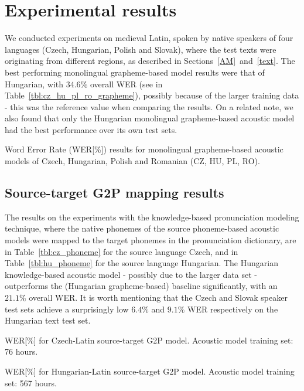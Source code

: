 \documentclass[runningheads,a4paper]{llncs}
\begin{document}
\section{Experimental results}\label{results}
We conducted experiments on medieval Latin, spoken by native speakers of four languages (Czech, Hungarian, Polish and Slovak), where the test texts were originating from different regions, as described in Sections~\ref{AM}~and~\ref{text}.
The best performing monolingual grapheme-based model results were that of Hungarian, with $34.6\%$ overall WER (see in Table~\ref{tbl:cz_hu_pl_ro_grapheme}), possibly because of the larger training data - this was the reference value when comparing the results.
On a related note, we also found that only the Hungarian monolingual grapheme-based acoustic model had the best performance over its own test sets.

\begin{table}
\centering
\caption{Word Error Rate (WER[\%]) results for monolingual grapheme-based acoustic models of Czech, Hungarian, Polish and Romanian (CZ, HU, PL, RO).}
\label{tbl:cz_hu_pl_ro_grapheme}
\end{table}

\subsection{Source-target G2P mapping results}
The results on the experiments with the knowledge-based pronunciation modeling technique, where the native phonemes of the source phoneme-based acoustic models were mapped to the target phonemes in the pronunciation dictionary, are in Table~\ref{tbl:cz_phoneme} for the source language Czech, and in Table~\ref{tbl:hu_phoneme} for the source language Hungarian.
The Hungarian knowledge-based acoustic model - possibly due to the larger data set - outperforms the (Hungarian grapheme-based) baseline significantly, with an $21.1\%$ overall WER.
It is worth mentioning that the Czech and Slovak speaker test sets achieve a surprisingly low $6.4\%$ and $9.1\%$ WER respectively on the Hungarian text test set.

\begin{table}
\parbox{.45\linewidth}{
\centering
\caption{WER[\%] for Czech-Latin source-target G2P model. Acoustic model training set: 76 hours.}
\label{tbl:cz_phoneme}
}
\hfill
\parbox{.45\linewidth}{
\centering
\caption{WER[\%] for Hungarian-Latin source-target G2P model. Acoustic model training set: 567 hours.}
\label{tbl:hu_phoneme}
}
\end{table}
\end{document}
